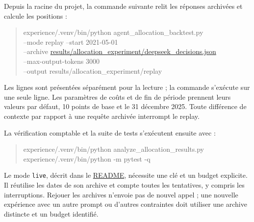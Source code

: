 Depuis la racine du projet, la commande suivante relit les réponses archivées et calcule les positions :

\begin{quote}\small\ttfamily
experience/.venv/bin/python agent\_allocation\_backtest.py\\
\hspace*{1em}--mode replay --start 2021-05-01\\
\hspace*{1em}--archive \href{https://github.com/AbouOpenSource/projet-end-master/blob/be691b42772e9d223b1304fae597ba13ac62d505/results/allocation_experiment/deepseek_decisions.json}{results/allocation\_experiment/deepseek\_decisions.json}\\
\hspace*{1em}--max-output-tokens 3000\\
\hspace*{1em}--output results/allocation\_experiment/replay
\end{quote}
Les lignes sont présentées séparément pour la lecture ; la commande s'exécute sur une seule ligne. Les paramètres de coûts et de fin de période prennent leurs valeurs par défaut, 10 points de base et le 31 décembre 2025. Toute différence de contexte par rapport à une requête archivée interrompt le replay.

La vérification comptable et la suite de tests s'exécutent ensuite avec :
\begin{quote}\small\ttfamily
experience/.venv/bin/python analyze\_allocation\_results.py\\[0.3em]
experience/.venv/bin/python -m pytest -q
\end{quote}

Le mode \texttt{live}, décrit dans le \href{https://github.com/AbouOpenSource/projet-end-master/blob/be691b42772e9d223b1304fae597ba13ac62d505/README.md}{README}, nécessite une clé et un budget explicite. Il réutilise les dates de son archive et compte toutes les tentatives, y compris les interruptions. Rejouer les archives n'envoie pas de nouvel appel ; une nouvelle expérience avec un autre prompt ou d'autres contraintes doit utiliser une archive distincte et un budget identifié.
